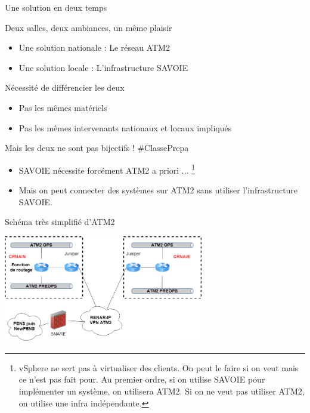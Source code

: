 \begin{frame}{Une solution en deux temps}
\begin{block}{Deux salles, deux ambiances, un même plaisir}
\begin{itemize}
    \item Une solution nationale : Le réseau ATM2 
    \item Une solution locale : L'infrastructure SAVOIE
\end{itemize}
\end{block} 

\begin{alertblock}{Nécessité de différencier les deux}
\begin{itemize}
    \item Pas les mêmes matériels
    \item Pas les mêmes intervenants nationaux et locaux impliqués
\end{itemize}
\end{alertblock} 

\begin{alertblock}{Mais les deux ne sont pas bijectifs ! \#ClassePrepa}
\begin{itemize}
    \item SAVOIE nécessite forcément ATM2 a priori ... \footnote{vSphere ne sert pas à virtualiser des clients. On peut le faire si on veut mais ce n'est pas fait pour. Au premier ordre, si on utilise SAVOIE pour implémenter un système, on utilisera ATM2. Si on ne veut pas utiliser ATM2, on utilise une infra indépendante.}
    \item Mais on peut connecter des systèmes sur ATM2 sans utiliser l'infrastructure SAVOIE. 
\end{itemize}
\end{alertblock}
\end{frame}

\begin{frame}{Schéma très simplifié d'ATM2}
\begin{center}
    \includegraphics[width=330px]{Schemas/ATM2.png}
\end{center}
\end{frame}

